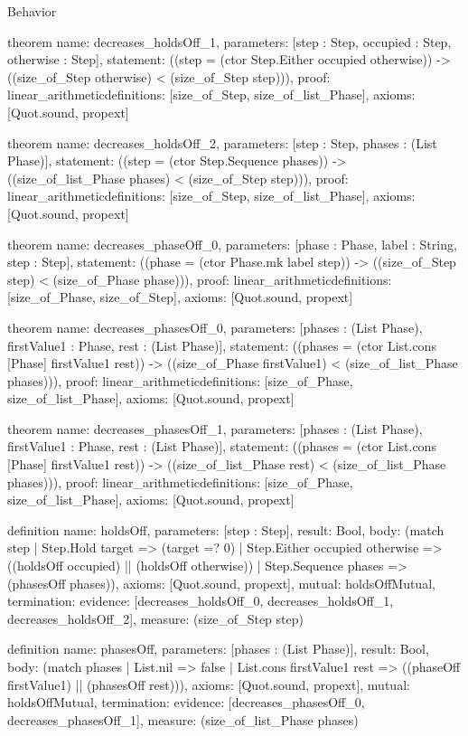 \begin{lexlean}{Behavior}
\begin{semanticmodule}
theorem{
  name: decreases_holdsOff_1,
  parameters: [step : Step, occupied : Step, otherwise : Step],
  statement: ((step = (ctor Step.Either occupied otherwise)) -> ((size_of_Step otherwise) < (size_of_Step step))),
  proof: linear_arithmetic{definitions: [size_of_Step, size_of_list_Phase]},
  axioms: [Quot.sound, propext]
}

theorem{
  name: decreases_holdsOff_2,
  parameters: [step : Step, phases : (List Phase)],
  statement: ((step = (ctor Step.Sequence phases)) -> ((size_of_list_Phase phases) < (size_of_Step step))),
  proof: linear_arithmetic{definitions: [size_of_Step, size_of_list_Phase]},
  axioms: [Quot.sound, propext]
}

theorem{
  name: decreases_phaseOff_0,
  parameters: [phase : Phase, label : String, step : Step],
  statement: ((phase = (ctor Phase.mk label step)) -> ((size_of_Step step) < (size_of_Phase phase))),
  proof: linear_arithmetic{definitions: [size_of_Phase, size_of_Step]},
  axioms: [Quot.sound, propext]
}

theorem{
  name: decreases_phasesOff_0,
  parameters: [phases : (List Phase), firstValue1 : Phase, rest : (List Phase)],
  statement: ((phases = (ctor List.cons [Phase] firstValue1 rest)) -> ((size_of_Phase firstValue1) < (size_of_list_Phase phases))),
  proof: linear_arithmetic{definitions: [size_of_Phase, size_of_list_Phase]},
  axioms: [Quot.sound, propext]
}

theorem{
  name: decreases_phasesOff_1,
  parameters: [phases : (List Phase), firstValue1 : Phase, rest : (List Phase)],
  statement: ((phases = (ctor List.cons [Phase] firstValue1 rest)) -> ((size_of_list_Phase rest) < (size_of_list_Phase phases))),
  proof: linear_arithmetic{definitions: [size_of_Phase, size_of_list_Phase]},
  axioms: [Quot.sound, propext]
}

definition{
  name: holdsOff,
  parameters: [step : Step],
  result: Bool,
  body: (match step
    | Step.Hold target => (target =? 0)
    | Step.Either occupied otherwise => ((holdsOff occupied) || (holdsOff otherwise))
    | Step.Sequence phases => (phasesOff phases)),
  axioms: [Quot.sound, propext],
  mutual: holdsOffMutual,
  termination: {
    evidence: [decreases_holdsOff_0, decreases_holdsOff_1, decreases_holdsOff_2],
    measure: (size_of_Step step)
  }
}

definition{
  name: phasesOff,
  parameters: [phases : (List Phase)],
  result: Bool,
  body: (match phases
    | List.nil => false
    | List.cons firstValue1 rest => ((phaseOff firstValue1) || (phasesOff rest))),
  axioms: [Quot.sound, propext],
  mutual: holdsOffMutual,
  termination: {
    evidence: [decreases_phasesOff_0, decreases_phasesOff_1],
    measure: (size_of_list_Phase phases)
  }
}


\end{semanticmodule}
\end{lexlean}
